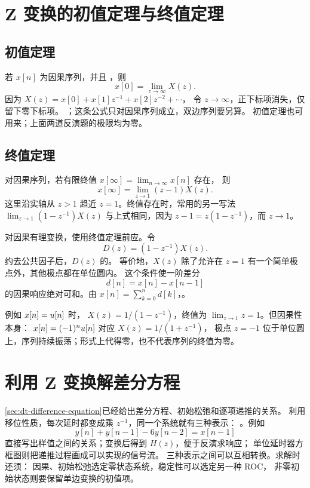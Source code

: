\section{Z 变换的初值定理与终值定理}
\label{sec:z-initial-final-value}

\subsection{初值定理}

若 $x[n]$ 为因果序列，并且 ，则
\begin{equation}
  x[0]=\lim_{z\to\infty}X(z).
  \label{eq:z-initial-value}
\end{equation}
因为
$X(z)=x[0]+x[1]z^{-1}+x[2]z^{-2}+\cdots$，
令 $z\to\infty$，正下标项消失，仅留下零下标项。
；这条公式只对因果序列成立，双边序列要另算。
初值定理也可用来；上面两道反演题的极限均为零。

\subsection{终值定理}

对因果序列，若有限终值 $x[\infty]=\lim_{n\to\infty}x[n]$ 存在，
则
\begin{equation}
  x[\infty]=\lim_{z\to1}(z-1)X(z).
  \label{eq:z-final-value}
\end{equation}
这里沿实轴从 $z>1$ 趋近 $z=1$。终值存在时，常用的另一写法
$\lim_{z\to1}(1-z^{-1})X(z)$ 与上式相同，因为
$z-1=z(1-z^{-1})$，而 $z\to1$。

对因果有理变换，使用终值定理前应。令
\[
  D(z)=(1-z^{-1})X(z).
\]
约去公共因子后，$D(z)$ 的。
等价地，$X(z)$ 除了允许在 $z=1$ 有一个简单极点外，其他极点都在单位圆内。
这个条件使一阶差分
\[
  d[n]=x[n]-x[n-1]
\]
的因果响应绝对可和。由 $x[n]=\sum_{k=0}^{n}d[k]$，。

例如 $x[n]=u[n]$ 时，
$X(z)=1/(1-z^{-1})$，终值为
$\lim_{z\to1}z=1$。但因果性本身：
$x[n]=(-1)^nu[n]$ 对应 $X(z)=1/(1+z^{-1})$，
极点 $z=-1$ 位于单位圆上，序列持续振荡；形式上代得零，也不代表序列的终值为零。

\section{利用 Z 变换解差分方程}
\label{sec:z-solve-difference-equation}

\cref{sec:dt-difference-equation}已经给出差分方程、初始松弛和逐项递推的关系。
利用移位性质，每次延时都变成乘 $z^{-1}$，同一个系统就有三种表示：
。例如
\[
  y[n]+y[n-1]-6y[n-2]=x[n-1]
\]
直接写出样值之间的关系；变换后得到 $H(z)$，便于反演求响应；
单位延时器方框图则把递推过程画成可以实现的信号流。
三种表示之间可以互相转换。求解时还须：
因果、初始松弛选定零状态系统，稳定性可以选定另一种 ROC，
非零初始状态则要保留单边变换的初值项。

